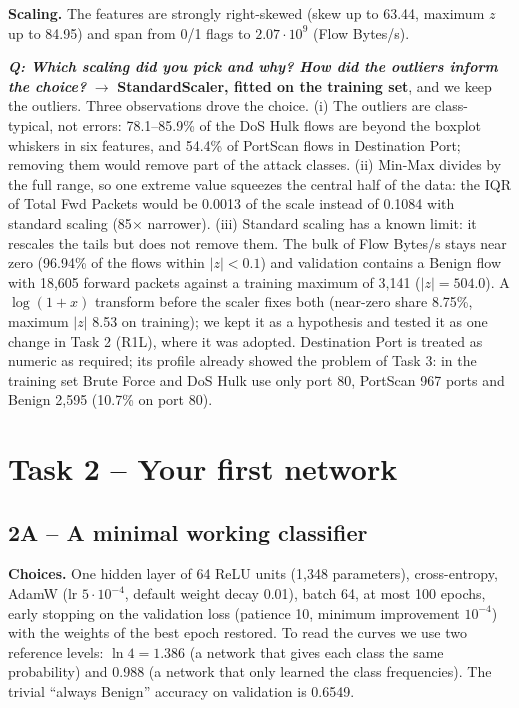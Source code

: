 \documentclass[9pt]{extarticle}
\newcommand{\Q}[1]{\textbf{\emph{Q: #1}}}
\newcommand{\run}[1]{\textsf{#1}}
\begin{document}
\textbf{Scaling.} The features are strongly right-skewed (skew up to 63.44, maximum $z$ up to 84.95) and span from 0/1 flags to $2.07\cdot10^9$ (Flow Bytes/s).

\Q{Which scaling did you pick and why? How did the outliers inform the choice?} $\rightarrow$ \textbf{StandardScaler, fitted on the training set}, and we keep the outliers. Three observations drove the choice. (i) The outliers are class-typical, not errors: 78.1--85.9\% of the DoS Hulk flows are beyond the boxplot whiskers in six features, and 54.4\% of PortScan flows in Destination Port; removing them would remove part of the attack classes. (ii) Min-Max divides by the full range, so one extreme value squeezes the central half of the data: the IQR of Total Fwd Packets would be 0.0013 of the scale instead of 0.1084 with standard scaling (85$\times$ narrower). (iii) Standard scaling has a known limit: it rescales the tails but does not remove them. The bulk of Flow Bytes/s stays near zero (96.94\% of the flows within $|z|<0.1$) and validation contains a Benign flow with 18,605 forward packets against a training maximum of 3,141 ($|z| = 504.0$). A $\log(1+x)$ transform before the scaler fixes both (near-zero share 8.75\%, maximum $|z|$ 8.53 on training); we kept it as a hypothesis and tested it as one change in Task 2 (\run{R1L}), where it was adopted. Destination Port is treated as numeric as required; its profile already showed the problem of Task 3: in the training set Brute Force and DoS Hulk use only port 80, PortScan 967 ports and Benign 2,595 (10.7\% on port 80).

\section{Task 2 -- Your first network}

\subsection*{2A -- A minimal working classifier}
\textbf{Choices.} One hidden layer of 64 ReLU units (1,348 parameters), cross-entropy, AdamW (lr $5\cdot10^{-4}$, default weight decay 0.01), batch 64, at most 100 epochs, early stopping on the validation loss (patience 10, minimum improvement $10^{-4}$) with the weights of the best epoch restored. To read the curves we use two reference levels: $\ln 4 = 1.386$ (a network that gives each class the same probability) and 0.988 (a network that only learned the class frequencies). The trivial ``always Benign'' accuracy on validation is 0.6549.
\end{document}
